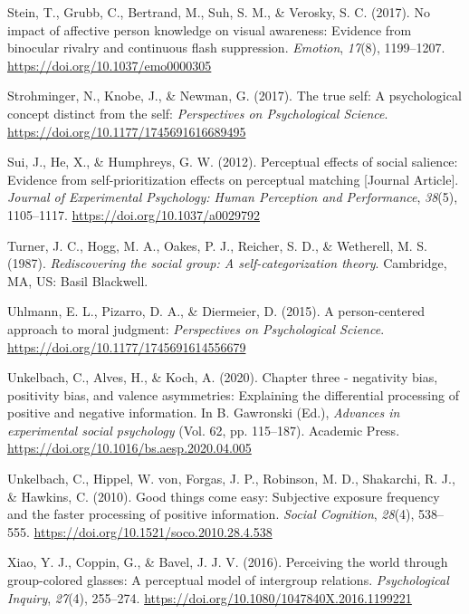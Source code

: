 \documentclass[
  man]{apa6}
\newlength{\cslhangindent}
\newlength{\cslentryspacingunit} %
\newenvironment{CSLReferences}[2] %
 {%
  \setlength{\parindent}{0pt}
  \ifodd #1
  \let\oldpar\par
  \def\par{\hangindent=\cslhangindent\oldpar}
  \fi
  \setlength{\parskip}{#2\cslentryspacingunit}
 }%
 {}
\begin{document}
\begin{CSLReferences}{1}{0}
\leavevmode{}%
Stein, T., Grubb, C., Bertrand, M., Suh, S. M., \& Verosky, S. C. (2017). No impact of affective person knowledge on visual awareness: Evidence from binocular rivalry and continuous flash suppression. \emph{Emotion}, \emph{17}(8), 1199--1207. \url{https://doi.org/10.1037/emo0000305}

\leavevmode{}%
Strohminger, N., Knobe, J., \& Newman, G. (2017). The true self: A psychological concept distinct from the self: \emph{Perspectives on Psychological Science}. \url{https://doi.org/10.1177/1745691616689495}

\leavevmode{}%
Sui, J., He, X., \& Humphreys, G. W. (2012). Perceptual effects of social salience: Evidence from self-prioritization effects on perceptual matching {[}Journal Article{]}. \emph{Journal of Experimental Psychology: Human Perception and Performance}, \emph{38}(5), 1105--1117. \url{https://doi.org/10.1037/a0029792}

\leavevmode{}%
Turner, J. C., Hogg, M. A., Oakes, P. J., Reicher, S. D., \& Wetherell, M. S. (1987). \emph{Rediscovering the social group: A self-categorization theory}. Cambridge, {MA}, {US}: Basil Blackwell.

\leavevmode{}%
Uhlmann, E. L., Pizarro, D. A., \& Diermeier, D. (2015). A person-centered approach to moral judgment: \emph{Perspectives on Psychological Science}. \url{https://doi.org/10.1177/1745691614556679}

\leavevmode{}%
Unkelbach, C., Alves, H., \& Koch, A. (2020). Chapter three - negativity bias, positivity bias, and valence asymmetries: Explaining the differential processing of positive and negative information. In B. Gawronski (Ed.), \emph{Advances in experimental social psychology} (Vol. 62, pp. 115--187). Academic Press. \url{https://doi.org/10.1016/bs.aesp.2020.04.005}

\leavevmode{}%
Unkelbach, C., Hippel, W. von, Forgas, J. P., Robinson, M. D., Shakarchi, R. J., \& Hawkins, C. (2010). Good things come easy: Subjective exposure frequency and the faster processing of positive information. \emph{Social Cognition}, \emph{28}(4), 538--555. \url{https://doi.org/10.1521/soco.2010.28.4.538}

\leavevmode{}%
Xiao, Y. J., Coppin, G., \& Bavel, J. J. V. (2016). Perceiving the world through group-colored glasses: A perceptual model of intergroup relations. \emph{Psychological Inquiry}, \emph{27}(4), 255--274. \url{https://doi.org/10.1080/1047840X.2016.1199221}

\end{CSLReferences}

\endgroup
\end{document}
